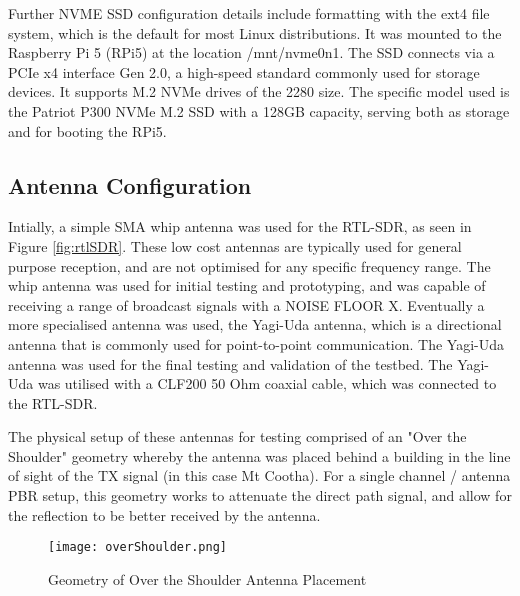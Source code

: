Further NVME SSD configuration details include formatting with the ext4 file system, which is the default for most Linux distributions. It was mounted to the Raspberry Pi 5 (RPi5) at the location /mnt/nvme0n1. The SSD connects via a PCIe x4 interface Gen 2.0, a high-speed standard commonly used for storage devices. It supports M.2 NVMe drives of the 2280 size. The specific model used is the Patriot P300 NVMe M.2 SSD with a 128GB capacity, serving both as storage and for booting the RPi5.


\subsection{Antenna Configuration \label{sec:antenna}}
Intially, a simple SMA whip antenna was used for the RTL-SDR, as seen in Figure \ref{fig:rtlSDR}. These low cost antennas are typically used for general purpose reception, and are not optimised for any specific frequency range. The whip antenna was used for initial testing and prototyping, and was capable of receiving a range of broadcast signals with a NOISE FLOOR X. Eventually a more specialised antenna was used, the Yagi-Uda antenna, which is a directional antenna that is commonly used for point-to-point communication. The Yagi-Uda antenna was used for the final testing and validation of the testbed. The Yagi-Uda was utilised with a CLF200 50 Ohm coaxial cable, which was connected to the RTL-SDR. 

The physical setup of these antennas for testing comprised of an "Over the Shoulder" geometry whereby the antenna was placed behind a building in the line of sight of the TX signal (in this case Mt Cootha). For a single channel / antenna PBR setup, this geometry works to attenuate the direct path signal, and allow for the reflection to be better received by the antenna. 

\begin{figure}[htbp]
    \centering
    \texttt{[image: overShoulder.png]}
    \caption{Geometry of Over the Shoulder Antenna Placement}
    \label{fig:overTheShoulder}
\end{figure}

